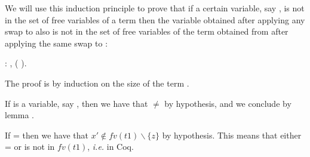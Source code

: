 We will use this induction principle to prove that if a certain variable, say , is not in the set of free variables of a term  then the variable obtained after applying any swap to  also is not in the set of free variables of the term obtained from  after applying the same swap to : 
\begin{coqdoccode}
\coqdocemptyline
\coqdocnoindent
{}  : \coqdockw{\ensuremath{\forall}}    ,             (   ).\coqdoceol
\end{coqdoccode}
 The proof is by induction on the size of the term .
\begin{coqdoccode}
\end{coqdoccode}
If  is a variable, say , then we have that  \ensuremath{\not=}  by hypothesis, and we conclude by lemma  \cite{msubstlemma}.
\begin{coqdoccode}
\end{coqdoccode}
If  =    then we have that $x' \notin fv(t1) \backslash \{z\}$ by hypothesis. This means that either  =  or  is not in $fv(t1)$, {\it i.e.}   in Coq.
\begin{coqdoccode}
\end{coqdoccode}
